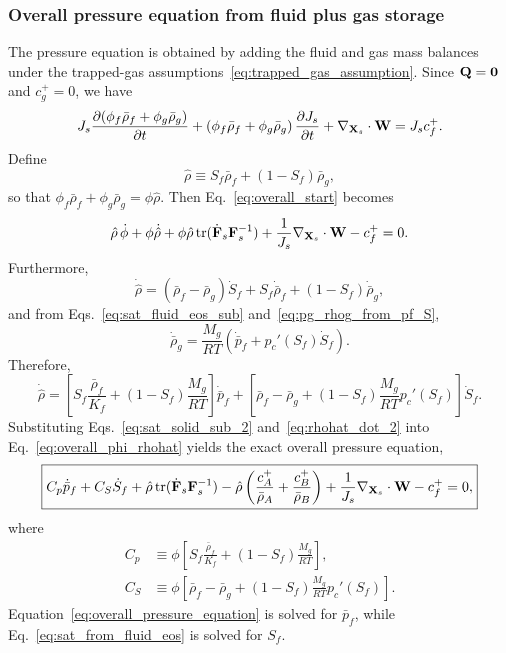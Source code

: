 \documentclass[11pt]{article}
\begin{document}
\subsubsection{Overall pressure equation from fluid plus gas storage}
The pressure equation is obtained by adding the fluid and gas mass balances under the trapped-gas assumptions~\eqref{eq:trapped_gas_assumption}. Since $\mathbf{Q}=\mathbf{0}$ and $c_g^+=0$, we have
\begin{equation}
  J_s\frac{\partial(\phi_f\bar\rho_f + \phi_g\bar\rho_g)}{\partial t} + \left(\phi_f\bar\rho_f + \phi_g\bar\rho_g\right)\frac{\partial J_s}{\partial t} + \nabla_{\mathbf{X}_s}\cdot\mathbf{W} = J_s c_f^+.
  \label{eq:overall_start}
\end{equation}
Define
\begin{equation}
  \hat\rho \equiv S_f\bar\rho_f + (1-S_f)\bar\rho_g,
  \label{eq:rhohat_def}
\end{equation}
so that $\phi_f\bar\rho_f + \phi_g\bar\rho_g = \phi\hat\rho$. Then Eq.~\eqref{eq:overall_start} becomes
\begin{equation}
  \hat\rho\,\dot\phi + \phi\dot{\hat\rho} + \phi\hat\rho\,\mbox{tr}(\dot{\mathbf{F}}_s\mathbf{F}_s^{-1}) + \frac{1}{J_s}\nabla_{\mathbf{X}_s}\cdot\mathbf{W} - c_f^+ = 0.
  \label{eq:overall_phi_rhohat}
\end{equation}
Furthermore,
\begin{equation}
  \dot{\hat\rho} = (\bar\rho_f-\bar\rho_g)\dot S_f + S_f\dot{\bar\rho}_f + (1-S_f)\dot{\bar\rho}_g,
  \label{eq:rhohat_dot_1}
\end{equation}
and from Eqs.~\eqref{eq:sat_fluid_eos_sub} and~\eqref{eq:pg_rhog_from_pf_S},
\begin{equation}
  \dot{\bar\rho}_g = \frac{M_g}{RT}\left(\dot{\bar p}_f + p_c'(S_f)\dot S_f\right).
  \label{eq:rhog_dot_pfSf}
\end{equation}
Therefore,
\begin{equation}
  \dot{\hat\rho} = \left[S_f\frac{\bar\rho_f}{K_f} + (1-S_f)\frac{M_g}{RT}\right]\dot{\bar p}_f + \left[\bar\rho_f-\bar\rho_g + (1-S_f)\frac{M_g}{RT}p_c'(S_f)\right]\dot S_f.
  \label{eq:rhohat_dot_2}
\end{equation}
Substituting Eqs.~\eqref{eq:sat_solid_sub_2} and~\eqref{eq:rhohat_dot_2} into Eq.~\eqref{eq:overall_phi_rhohat} yields the exact overall pressure equation,
\begin{equation}
  \boxed{C_p\dot{\bar p}_f + C_S\dot S_f + \hat\rho\,\mbox{tr}(\dot{\mathbf{F}}_s\mathbf{F}_s^{-1}) - \hat\rho\left(\frac{c_A^+}{\bar\rho_A} + \frac{c_B^+}{\bar\rho_B}\right) + \frac{1}{J_s}\nabla_{\mathbf{X}_s}\cdot\mathbf{W} - c_f^+ = 0,}
  \label{eq:overall_pressure_equation}
\end{equation}
where
\begin{align}
  C_p &\equiv \phi\left[S_f\frac{\bar\rho_f}{K_f} + (1-S_f)\frac{M_g}{RT}\right],
  \label{eq:Cp_def}\\
  C_S &\equiv \phi\left[\bar\rho_f-\bar\rho_g + (1-S_f)\frac{M_g}{RT}p_c'(S_f)\right].
  \label{eq:Cs_def}
\end{align}
Equation~\eqref{eq:overall_pressure_equation} is solved for $\bar p_f$, while Eq.~\eqref{eq:sat_from_fluid_eos} is solved for $S_f$.
\end{document}
